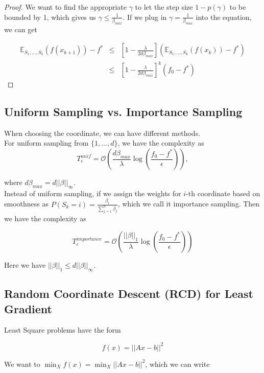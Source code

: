\documentclass[12pt]{report}
\begin{document}
\begin{proof}
We want to find the appropriate $\gamma$ to let the step size $1-p(\gamma)$ to be bounded by 1, which gives us $\gamma \leq \frac{1}{\beta_{max}}$. If we plug in $\gamma = \frac{1}{\beta_{max}}$ into the equation, we can get

\begin{eqnarray*}
\mathbb{E}_{S_1,\dots, S_k} (f(x_{k+1})) -f^* &\leq& [1- \frac{\lambda}{2d \beta_{max}}] (\mathbb{E}_{S_1,\dots, S_k} (f(x_k)) - f^*)\\
&\leq& [1- \frac{\lambda}{2d \beta_{max}}]^k (f_0 - f^*)
\end{eqnarray*}

\end{proof}





\vspace{1cm}
\subsection{Uniform Sampling vs. Importance Sampling}
When choosing the coordinate, we can have different methods.\\

For uniform sampling from $\{1, \dots,d\}$, we have the complexity as
$$T_{\epsilon}^{unif} = \mathcal{O} (\frac{d\beta_{max}}{\lambda} \log(\frac{f_0-f^*}{\epsilon})),$$

where $d\beta_{max} = d||\beta||_{\infty}$.\\

Instead of uniform sampling, if we assign the weights for $i$-th coordinate based on smoothness as $P(S_k = i) = \frac{\beta_i}{\sum_{j=1}^n \beta_j}$, which we call it importance sampling. Then we have the complexity as

$$T_{\epsilon}^{importance} = \mathcal{O} (\frac{||\beta||_1}{\lambda} \log (\frac{f_0-f^*}{\epsilon}))$$

Here we have $||\beta||_1 \leq d||\beta||_{\infty}$.





\vspace{1cm}
\subsection{Random Coordinate Descent (RCD) for Least Gradient}
Least Square problems have the form

$$f(x) = ||Ax-b||^2$$ 

We want to $\min_{X} f(x)= \min_X  ||Ax-b||^2$, which we can write
\end{document}
